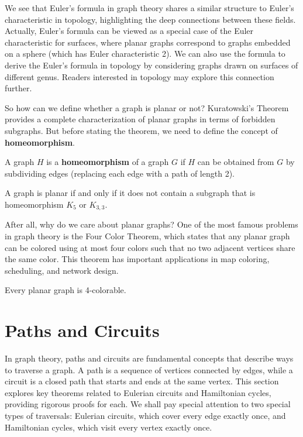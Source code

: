 \documentclass[oneside]{book}
\begin{document}
We see that Euler's formula in graph theory shares a similar structure to Euler's characteristic in topology, highlighting the deep connections between these fields. Actually, Euler's formula can be viewed as a special case of the Euler characteristic for surfaces, where planar graphs correspond to graphs embedded on a sphere (which has Euler characteristic 2). We can also use the formula to derive the Euler's formula in topology by considering graphs drawn on surfaces of different genus. Readers interested in topology may explore this connection further.

So how can we define whether a graph is planar or not? Kuratowski's Theorem provides a complete characterization of planar graphs in terms of forbidden subgraphs. But before stating the theorem, we need to define the concept of \textbf{homeomorphism}.

\begin{definition}
A graph $H$ is a \textbf{homeomorphism} of a graph $G$ if $H$ can be obtained from $G$ by subdividing edges (replacing each edge with a path of length 2).
\end{definition}

\begin{theorem}
A graph is planar if and only if it does not contain a subgraph that is homeomorphism $K_5$ or $K_{3,3}$.
\end{theorem}

After all, why do we care about planar graphs? One of the most famous problems in graph theory is the Four Color Theorem, which states that any planar graph can be colored using at most four colors such that no two adjacent vertices share the same color. This theorem has important applications in map coloring, scheduling, and network design.

\begin{theorem}
Every planar graph is 4-colorable.
\end{theorem}

\section{Paths and Circuits}

In graph theory, paths and circuits are fundamental concepts that describe ways to traverse a graph. A path is a sequence of vertices connected by edges, while a circuit is a closed path that starts and ends at the same vertex. This section explores key theorems related to Eulerian circuits and Hamiltonian cycles, providing rigorous proofs for each. We shall pay special attention to two special types of traversals: Eulerian circuits, which cover every edge exactly once, and Hamiltonian cycles, which visit every vertex exactly once.
\end{document}
